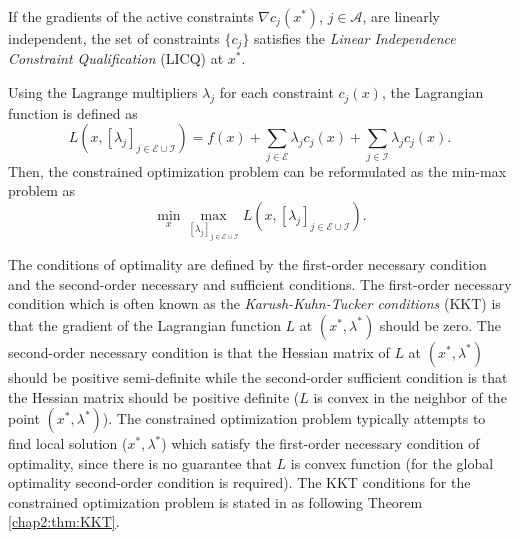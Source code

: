 \begin{definition}
  If the gradients of the active constraints $\nabla c_j(x^*)$, $j\in\mathcal A$, are linearly independent, the set of constraints $\{c_j\}$ satisfies the \textit{Linear Independence Constraint Qualification} (LICQ) at $x^*$.
  \label{chap2:def:LICQ}  
\end{definition}

Using the Lagrange multipliers $\lambda_j$ for each constraint $c_j(x)$, the Lagrangian function is defined as
\begin{equation}
    L(x,[\lambda_j]_{j\in\mathcal E\cup\mathcal I}) = f(x) + \sum_{j\in\mathcal E}\lambda_jc_j(x) + \sum_{j\in\mathcal I}\lambda_jc_j(x)
    .
\end{equation}
Then, the constrained optimization problem can be reformulated as the min-max problem as
\begin{equation}
  \min_x \max_{[\lambda_j]_{j\in\mathcal E\cup\mathcal I}} L(x, [\lambda_j]_{j\in\mathcal E\cup\mathcal I})
  .
\end{equation}

The conditions of optimality are defined by the first-order necessary condition and the second-order necessary and sufficient conditions.
The first-order necessary condition which is often known as the \textit{Karush-Kuhn-Tucker conditions} (KKT) is that the gradient of the Lagrangian function $L$ at $(x^*,\lambda^*)$ should be zero.
The second-order necessary condition is that the Hessian matrix of $L$ at $(x^*,\lambda^*)$ should be positive semi-definite while the second-order sufficient condition is that the Hessian matrix should be positive definite (\ie $L$ is convex in the neighbor of the point $(x^*,\lambda^*)$).
The constrained optimization problem typically attempts to find local solution ($x^*,\lambda^*$) which satisfy the first-order necessary condition of optimality, since there is no guarantee that $L$ is convex function (\ie for the global optimality second-order condition is required).
The KKT conditions for the constrained optimization problem is stated in \cite{RN9} as following Theorem \ref{chap2:thm:KKT}.

